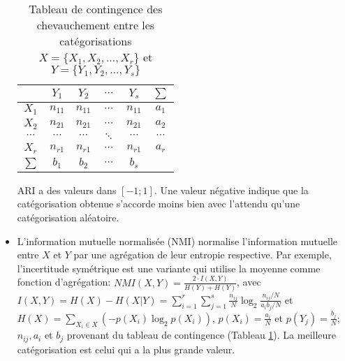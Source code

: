 \begin{itemize}
	\begin{table}[!htb]
		\centering \scriptsize
		\begin{tabular}{|c|c|c|c|c|c|}
			\hline
			& $Y_1$    & $Y_2$    & $\cdots$ & $Y_s$    & $\sum$   \\ \hline
			$X_1$    & $n_{11}$ & $n_{11}$ & $\cdots$ & $n_{11}$ & $a_1$    \\ \hline
			$X_2$    & $n_{21}$ & $n_{21}$ & $\cdots$ & $n_{21}$ & $a_2$    \\ \hline
			$\cdots$ & $\cdots$ & $\cdots$ & $\ddots$ & $\cdots$ & $\cdots$ \\ \hline
			$X_r$    & $n_{r1}$ & $n_{r1}$ & $\cdots$ & $n_{r1}$ & $a_r$    \\ \hline
			$\sum$   & $b_1$    & $b_2$    & $\cdots$ & $b_s$    &          \\ \hline
		\end{tabular}
		\caption{Tableau de contingence des chevauchement entre les catégorisations $X = \lbrace X_1, X_2, ..., X_r \rbrace$ et $Y = \lbrace Y_1, Y_2, ..., Y_s \rbrace$}  \label{tab:similarite:tab-contingence}
	\end{table}
ARI a des valeurs dans $[-1;1]$. Une valeur négative indique que la catégorisation obtenue s'accorde moins bien avec l'attendu qu'une catégorisation aléatoire. 
	\item L'information mutuelle normalisée (NMI) \citep{kvalseth1987entropy_NMI,strehl2000nmi, vinh2010clusteringComparison} normalise l'information mutuelle entre $X$ et $Y$ par une agrégation de leur entropie respective. Par exemple, l'incertitude symétrique \citep{kvalseth1987entropy_NMI} est une variante qui utilise la moyenne comme fonction d'agrégation:  $NMI(X,Y) = \frac{2 \cdot I(X,Y)}{H(Y) + H(Y)} $, 
	avec $I(X,Y) = H(X) - H(X \vert Y) = \sum\limits_{i=1}^{r}\sum\limits_{j=1}^{s} \frac{n_{ij}}{N} \log_2\frac{{n_{ij}}/{N}}{{a_ib_j}/{N}}$ et $H(X) = \sum\limits_{X_i \in X}\left(- p(X_i)\log_2 p(X_i)\right)$,  $p(X_i) = \frac{a_i}{N}$ et $p(Y_j) = \frac{b_j}{N}$; $n_{ij}, a_i$ et $b_j$ provenant du tableau de contingence (Tableau \ref{tab:similarite:tab-contingence}). La meilleure catégorisation est celui qui a la plus grande valeur.
	

\end{itemize}
